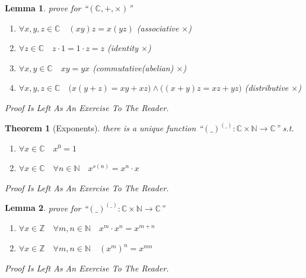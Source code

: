 \documentclass[10pt,a4paper]{book}
\newtheorem{theorem}{Theorem}[section]
\newtheorem{lemma}{Lemma}[section]
\begin{document}
\begin{lemma}prove for  ``$ (\mathbb{C} , + , \times )  $''
    \begin{enumerate}
        \setlength{\itemsep}{0pt} %
        \item       $\forall x ,y ,z  \in \mathbb{C} \quad (x   y )  z  = x  (y   z )  $ (associative $\times$)
        \item       $\forall z \in \mathbb{C} \quad z \cdot 1 = 1 \cdot  z = z$ (identity  $\times$)
        \item       $\forall x ,y  \in \mathbb{C} \quad x   y  = y   x $  (commutative(abelian)  $\times$)
        \item       $\forall x ,y ,z  \in \mathbb{C} \quad \Big(x   (y  + z ) = x   y  +  x   z  \Big)
                  \land     \Big((x  + y )  z  = x   z  +  y   z  \Big)  $ (distributive $\times$)
    \end{enumerate}
    Proof Is Left As An Exercise To The Reader.
\end{lemma}

\begin{theorem}[Exponents] there is a unique function ``$(\_)^{(\_)} :\mathbb{C} \times \mathbb{N} \to \mathbb{C}$'' s.t.

    \begin{enumerate}
        \setlength{\itemsep}{0pt} %
        \item       $\forall x \in \mathbb{C} \quad x ^ 0 = 1$
        \item       $\forall x \in \mathbb{C} \quad \forall n \in \mathbb{N} \quad  x ^ {s(n)} = x ^ n \cdot x   $
    \end{enumerate}
    Proof Is Left As An Exercise To The Reader.
\end{theorem}

\begin{lemma}prove for ``$(\_)^{(\_)} :\mathbb{C} \times \mathbb{N} \to \mathbb{C}$''
    \begin{enumerate}
        \setlength{\itemsep}{0pt} %
        \item       $\forall x   \in \mathbb{Z} \quad \forall m ,n  \in \mathbb{N} \quad  x^m  \cdot  x^n = x^{m  + n}  $
        \item       $\forall x   \in \mathbb{Z} \quad \forall m ,n  \in \mathbb{N} \quad (x^m)^n = x^{m n}  $
    \end{enumerate}
    Proof Is Left As An Exercise To The Reader.
\end{lemma}
\end{document}
